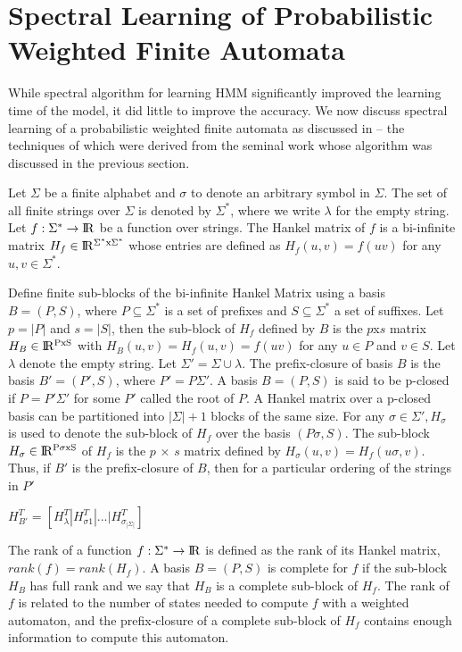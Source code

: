 \documentclass[letterpaper]{article}
\begin{document}
\section{Spectral Learning of Probabilistic Weighted Finite Automata}
While spectral algorithm for learning HMM significantly improved the learning time of the model, it did little to improve the accuracy. We now discuss spectral learning of a probabilistic weighted finite automata as discussed in \cite{spectral}-- the techniques of which were derived from the seminal work \cite{slhmm} whose algorithm was discussed in the previous section.

Let $\Sigma$ be a finite alphabet and $\sigma$ to denote an arbitrary symbol in $\Sigma$. The set of all finite strings over $\Sigma$ is denoted by $\Sigma^{*}$, where we write $\lambda$ for the empty string. Let $f:\Sigma^{*} \rightarrow \rm I\!R$ be a function over strings. The Hankel matrix of $f$ is a bi-infinite matrix $H_{f} \in \rm I\!R^{\Sigma^{*}x\Sigma^{*}}$ whose entries are defined as $H_{f}(u,v) = f(uv)$ for any $u, v \in \Sigma^{*}$. 

Define finite sub-blocks of the bi-infinite Hankel Matrix using a basis $B = (P, S)$, where $P \subseteq \Sigma^{*}$ is a set of prefixes and $S \subseteq \Sigma^{*}$ a set of suffixes. Let $p = |P|$ and $s = |S|$, then the sub-block of $H_{f}$ defined by $B$ is the $p $x$ s$ matrix $H_{B} \in \rm I\!R^{PxS}$ with $H_{B}(u,v) = H_{f}(u,v) = f(uv)$ for any $u \in P$ and $v \in S$. Let $\lambda$ denote the empty string. Let $\Sigma' = \Sigma\cup\lambda$. The prefix-closure of basis $B$ is the basis $B' = (P', S)$, where $P' = P\Sigma'$. A basis $B = (P,S)$ is said to be p-closed if $P = P'\Sigma'$ for some $P'$ called the root of $P$. A Hankel matrix over a p-closed basis can be partitioned into $|\Sigma| + 1$ blocks of the same size. For any $\sigma \in \Sigma', H_{\sigma}$ is used to denote the sub-block of $H_{f}$ over the basis $(P\sigma, S)$. The sub-block $H_{\sigma} \in \rm I\!R^{
	P\sigma xS}$ of $H_{f}$ is the $p$ × $s$ matrix defined by $H_{\sigma}(u,v) = H_{f}(u\sigma, v)$. Thus, if $B'$ is the prefix-closure of $B$, then for a particular ordering of the strings in $P'$ 

\begin{center}
	$H^{T}_{B'} = \left[ H_{\lambda}^{T} | H_{\sigma 1}^{T} | ... |H_{\sigma_{|\Sigma|}}^{T} \right] $
\end{center}

The rank of a function $f : \Sigma^{*} \rightarrow \rm I\!R$ is defined as the rank of its Hankel matrix, $rank(f) = rank(H_{f})$. A basis $B = (P,S)$ is complete for $f$ if the sub-block $H_{B}$ has full rank and we say that $H_{B}$ is a complete sub-block of $H_{f}$. The rank of $f$ is related to the number of states needed to compute $f$ with a weighted automaton, and the prefix-closure of a complete sub-block of $H_{f}$ contains enough information to compute this automaton. 
\end{document}
